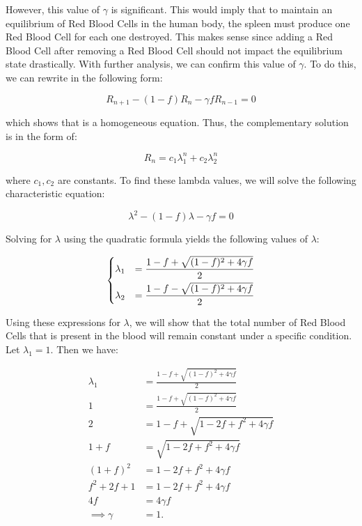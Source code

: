 However, this value of $\gamma$ is significant. This would imply that to maintain an equilibrium of Red Blood Cells in the human body, the spleen must produce one Red Blood Cell for each one destroyed. This makes sense since adding a Red Blood Cell after removing a Red Blood Cell should not impact the equilibrium state drastically. With further analysis, we can confirm this value of $\gamma$. To do this, we can rewrite  in the following form:

\begin{equation}
    R_{n+1} - (1-f)R_n - \gamma fR_{n-1} = 0
    \label{eq:linear-difference-model-equation-2}
\end{equation}

which shows that  is a homogeneous equation. Thus, the complementary solution is in the form of:

\begin{equation*}
    R_n = c_1\lambda_1^n + c_2\lambda_2^n
\end{equation*}

where $c_1,c_2$ are constants. To find these lambda values, we will solve the following characteristic equation:

\begin{equation}
    \lambda^2 - (1 - f)\lambda - \gamma f = 0
    \label{eq:linear-difference-model-characteristic-equation}
\end{equation}

Solving  for $\lambda$ using the quadratic formula yields the following values of $\lambda$:

\[
\begin{dcases}
    \lambda_1 &= \frac{1-f + \sqrt{(1-f)^2 + 4\gamma f}}{2}\\
    \lambda_2 &= \frac{1-f - \sqrt{(1-f)^2 + 4\gamma f}}{2}
\end{dcases}
\]

Using these expressions for $\lambda$, we will show that the total number of Red Blood Cells that is present in the blood will remain constant under a specific condition. Let $\lambda_1=1$. Then we have:

\begin{align*}
    \lambda_1 &= \frac{1-f + \sqrt{(1-f)^2 + 4\gamma f}}{2}\\
    1 &= \frac{1-f + \sqrt{(1-f)^2 + 4\gamma f}}{2}\\
    2 &= 1-f + \sqrt{1 - 2f + f^2 + 4\gamma f}\\
    1 + f &= \sqrt{1 - 2f + f^2 + 4\gamma f}\\
    (1 + f)^2 &= 1 - 2f + f^2 + 4\gamma f\\
    f^2 + 2f + 1 &= 1 - 2f + f^2 + 4\gamma f\\
    4f &= 4\gamma f\\
    \implies\gamma &= 1.
\end{align*}

